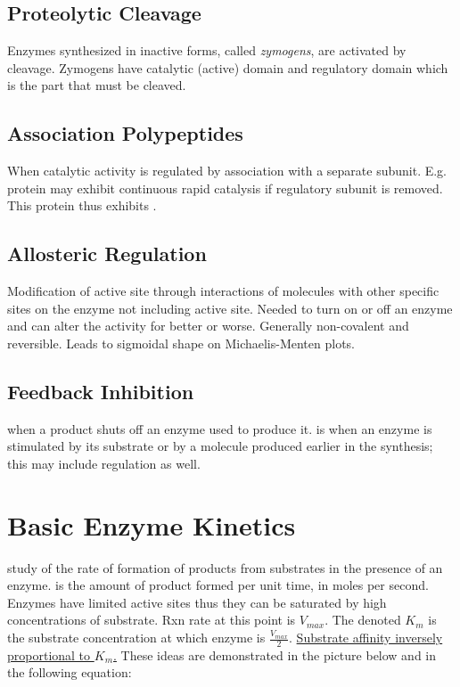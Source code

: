 \documentclass[../Bio_chemistryReview.tex]{subfiles}
\begin{document}
\subsection{Proteolytic Cleavage\supddag}

Enzymes synthesized in inactive forms, called \emph{zymogens}, are activated by
cleavage. Zymogens have catalytic (active) domain and regulatory domain which is
the part that must be cleaved. 

\subsection{Association Polypeptides}

When catalytic activity is regulated by association with a separate subunit.
E.g. protein may exhibit continuous rapid catalysis if regulatory subunit is
removed. This protein thus exhibits .

\subsection{Allosteric Regulation\supddag}

Modification of active site through interactions of molecules with other
specific sites on the enzyme not including active site. Needed to turn on or off
an enzyme and can alter the activity for better or worse. Generally non-covalent
and reversible. Leads to sigmoidal shape on Michaelis-Menten plots.

\subsection{Feedback Inhibition\supddag}

 when a product shuts off an
enzyme used to produce it.  is when an enzyme is
stimulated by its substrate or by a molecule produced earlier in the synthesis;
this may include regulation as well. 

\section{Basic Enzyme Kinetics\supddag}

 study of the rate of formation of products from
substrates in the presence of an enzyme.  is the amount of
product formed per unit time, in moles per second. Enzymes have limited active
sites thus they can be saturated by high concentrations of substrate. Rxn rate
at this point is $ V_{max} $. The  denoted $ K_{m} $
is the substrate concentration at which enzyme is $ \tfrac{V_{max}}{2} $.
\underline{Substrate affinity inversely proportional to $ K_{m} $.} These ideas
are demonstrated in the picture below and in the following equation:
\end{document}
